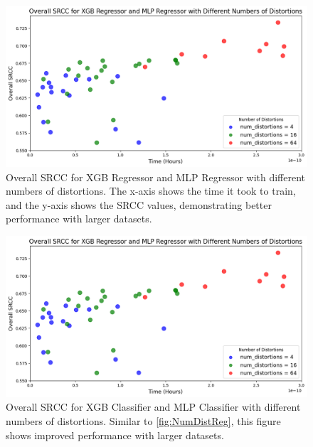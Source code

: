 \begin{figure}[ht]
    \centering
    \includegraphics[keepaspectratio,width=15cm]{img/num_dist_reg.png}
    \caption{Overall SRCC for XGB Regressor and MLP Regressor with different numbers of distortions. The x-axis shows the time it took to train, and the y-axis shows the SRCC values, demonstrating better performance with larger datasets.}
    \label{fig:NumDistReg}
\end{figure}
\begin{figure}[ht]
    \centering
    \includegraphics[keepaspectratio,width=15cm]{img/num_dist_cls.png}
    \caption{Overall SRCC for XGB Classifier and MLP Classifier with different numbers of distortions. Similar to \autoref{fig:NumDistReg}, this figure shows improved performance with larger datasets.}
    \label{fig:NumDistCls}
\end{figure}

